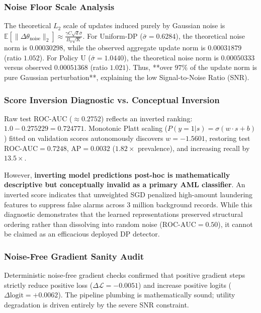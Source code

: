\documentclass[conference]{IEEEtran}
\begin{document}
\subsubsection{Noise Floor Scale Analysis}
The theoretical $L_2$ scale of updates induced purely by Gaussian noise is $\mathbb{E}[\|\Delta \theta_{\text{noise}}\|_2] \approx \frac{\gamma C \sqrt{d} \bar{\sigma}}{B_0 \sqrt{K}}$. For Uniform-DP ($\bar{\sigma} = 0.6284$), the theoretical noise norm is $0.00030298$, while the observed aggregate update norm is $0.00031879$ (ratio $\mathbf{1.052}$). For Policy U ($\bar{\sigma} = 1.0440$), the theoretical noise norm is $0.00050333$ versus observed $0.00051368$ (ratio $\mathbf{1.021}$). Thus, **over $97\%$ of the update norm is pure Gaussian perturbation**, explaining the low Signal-to-Noise Ratio (SNR).

\subsubsection{Score Inversion Diagnostic vs. Conceptual Inversion}
Raw test ROC-AUC ($\approx 0.2752$) reflects an inverted ranking: $1.0 - 0.275229 = \mathbf{0.724771}$. Monotonic Platt scaling ($P(y=1|s) = \sigma(w \cdot s + b)$) fitted on validation scores autonomously discovers $w = -1.5601$, restoring test $\text{ROC-AUC} = \mathbf{0.7248}$, $\text{AP} = \mathbf{0.0032}$ ($1.82\times$ prevalence), and increasing recall by $13.5\times$. 

However, \textbf{inverting model predictions post-hoc is mathematically descriptive but conceptually invalid as a primary AML classifier}. An inverted score indicates that unweighted SGD penalized high-amount laundering features to suppress false alarms across 3 million background records. While this diagnostic demonstrates that the learned representations preserved structural ordering rather than dissolving into random noise ($\text{ROC-AUC} = 0.50$), it cannot be claimed as an efficacious deployed DP detector.

\subsubsection{Noise-Free Gradient Sanity Audit}
Deterministic noise-free gradient checks confirmed that positive gradient steps strictly reduce positive loss ($\Delta \mathcal{L} = -0.0051$) and increase positive logits ($\Delta \text{logit} = +0.0062$). The pipeline plumbing is mathematically sound; utility degradation is driven entirely by the severe SNR constraint.
\end{document}
